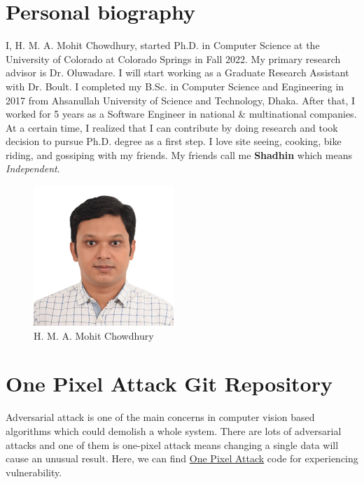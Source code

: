 
% 
\section{Personal biography}
I, H. M. A. Mohit Chowdhury, started Ph.D. in Computer Science at the University of Colorado at Colorado Springs in Fall 2022. My primary research advisor is Dr. Oluwadare. I will start working as a Graduate Research Assistant with Dr. Boult. I completed my B.Sc. in Computer Science and Engineering in 2017 from Ahsanullah University of Science and Technology, Dhaka. After that, I worked for 5 years as a Software Engineer in national \& multinational companies. At a certain time, I realized that I can contribute by doing research and took decision to pursue Ph.D. degree as a first step. I love site seeing, cooking, bike riding, and gossiping with my friends. My friends call me \textbf{Shadhin} which means \textit{Independent}.

\begin{figure}[h] \center
    \includegraphics[scale=1]{chowdhury.jpg}
    \caption{H. M. A. Mohit Chowdhury}
    \label{fig:chowdhury}
\end{figure}

\section{One Pixel Attack Git Repository}
Adversarial attack is one of the main concerns in computer vision based algorithms which could demolish a whole system. There are lots of adversarial attacks and one of them is one-pixel attack means changing a single data will cause an unusual result. Here, we can find \href{https://github.com/Hyperparticle/one-pixel-attack-keras}{One Pixel Attack} code for experiencing vulnerability.

